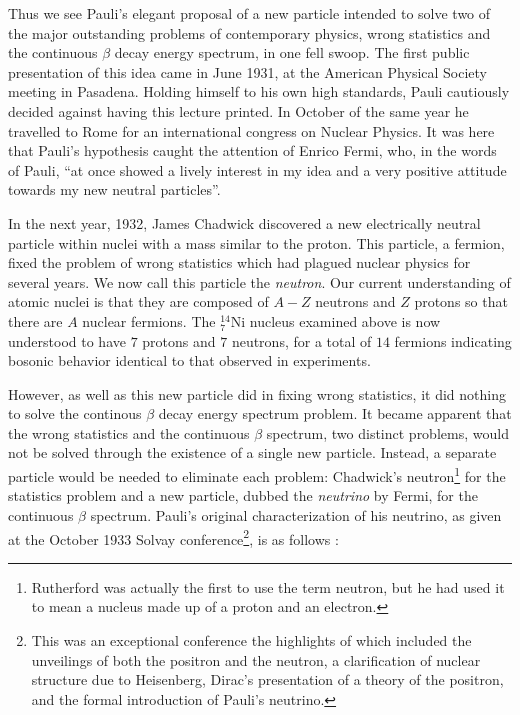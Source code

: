 \documentclass[a4paper,12pt]{book}
\begin{document}
Thus we see Pauli's elegant proposal of a new particle intended to solve two of the major outstanding problems of contemporary physics, wrong statistics and the continuous $\beta$ decay energy spectrum, in one fell swoop. The first public presentation of this idea came in June 1931, at the American Physical Society meeting in Pasadena. Holding himself to his own high standards, Pauli cautiously decided against having this lecture printed. In October of the same year he travelled to Rome for an international congress on Nuclear Physics. It was here that Pauli's hypothesis caught the attention of Enrico Fermi, who, in the words of Pauli\cite{pauli:writings}, ``at once showed a lively interest in my idea and a very positive attitude towards my new neutral particles''.

In the next year, 1932, James Chadwick discovered a new electrically neutral particle within nuclei with a mass similar to the proton. This particle, a fermion, fixed the problem of wrong statistics which had plagued nuclear physics for several years. We now call this particle the \textit{neutron}. Our current understanding of atomic nuclei is that they are composed of $A-Z$ neutrons and $Z$ protons so that there are $A$ nuclear fermions. The $^{14}_{7}$Ni nucleus examined above is now understood to have $7$ protons and $7$ neutrons, for a total of $14$ fermions indicating bosonic behavior identical to that observed in experiments.

However, as well as this new particle did in fixing wrong statistics, it did nothing to solve the continous $\beta$ decay energy spectrum problem. It became apparent that the wrong statistics and the continuous $\beta$ spectrum, two distinct problems, would not be solved through the existence of a single new particle. Instead, a separate particle would be needed to eliminate each problem: Chadwick's neutron\footnote{Rutherford was actually the first to use the term neutron, but he had used it
to mean a nucleus made up of a proton and an electron.} for the statistics problem and a new particle, dubbed the \emph{neutrino} by Fermi, for the continuous $\beta$ spectrum\cite{pauli:writings}. Pauli's original characterization of his neutrino, as given at the October 1933 Solvay conference\footnote{This was an exceptional conference the highlights of which included the unveilings of both the positron and the neutron, a clarification of nuclear structure due to Heisenberg, Dirac's presentation of a theory of the positron, and the formal introduction of Pauli's neutrino.}, is as follows \cite{solvay}:
\end{document}
